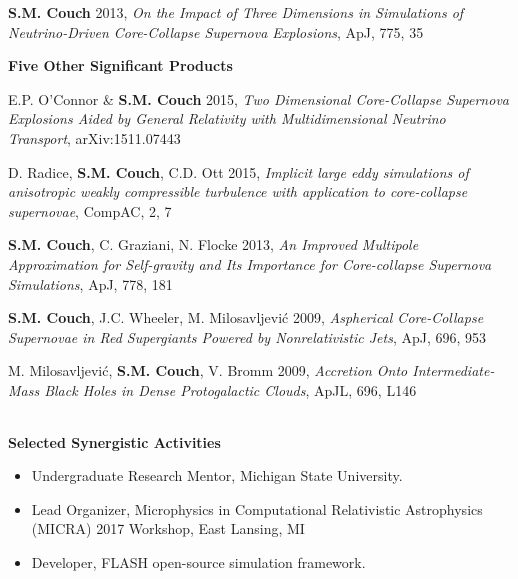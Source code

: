 \documentclass[10pt,letterpaper]{article}
\begin{document}
{\bf S.M. Couch} 2013, \emph{On the Impact of Three Dimensions in Simulations of Neutrino-Driven Core-Collapse Supernova Explosions}, ApJ, 775, 35


\vspace{.1in}
{\large \bf Five Other Significant Products}

E.P. O'Connor \& {\bf S.M. Couch} 2015, \emph{Two Dimensional Core-Collapse Supernova Explosions Aided by General Relativity with Multidimensional Neutrino Transport}, arXiv:1511.07443

D. Radice, {\bf S.M. Couch}, C.D. Ott 2015, \emph{Implicit large eddy simulations of anisotropic weakly compressible turbulence with application to core-collapse supernovae}, CompAC, 2, 7

{\bf S.M. Couch}, C. Graziani, N. Flocke 2013, \emph{An Improved Multipole Approximation for Self-gravity and Its Importance for Core-collapse Supernova Simulations}, ApJ, 778, 181


{\bf S.M. Couch}, J.C. Wheeler, M. Milosavljevi\'c 2009,
\emph{Aspherical Core-Collapse Supernovae in Red Supergiants Powered
  by Nonrelativistic Jets}, ApJ, 696, 953

M. Milosavljevi\'c, {\bf S.M. Couch}, V. Bromm 2009, \emph{Accretion Onto Intermediate-Mass Black Holes in Dense Protogalactic Clouds}, ApJL, 696, L146


\begin{tabular*}{\textwidth}{l}\hline\end{tabular*}

{\large \bf Selected Synergistic Activities}

\begin{itemize}

\item Undergraduate Research Mentor, Michigan State University.

\item Lead Organizer, Microphysics in Computational Relativistic Astrophysics (MICRA) 2017 Workshop, East Lansing, MI

\item Developer, FLASH open-source simulation framework.

\end{itemize}
\end{document}
